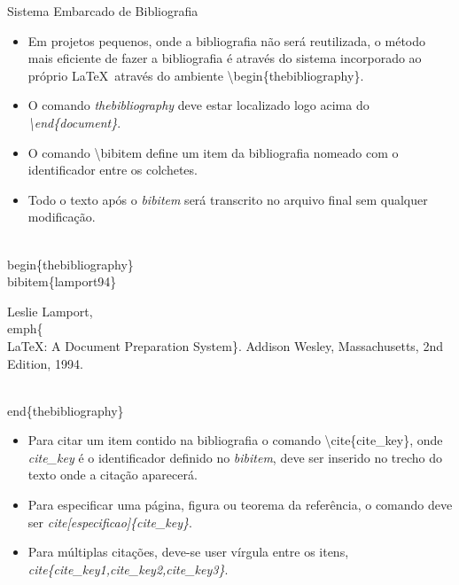 \begin{frame}{Sistema Embarcado de Bibliografia}

  \begin{itemize}
    \item Em projetos pequenos, onde a bibliografia não será reutilizada, o método mais eficiente de fazer a bibliografia
    é através do sistema incorporado ao próprio \LaTeX\ através do ambiente \alert{\textbackslash begin\{thebibliography\}}.    
    \item O comando \textit{thebibliography} deve estar localizado logo acima do \textit{\textbackslash end\{document\}}.
    \item O comando \alert{\textbackslash bibitem} define um item da bibliografia nomeado com o identificador entre os colchetes.
    \item Todo o texto após o \textit{bibitem} será transcrito no arquivo final sem qualquer modificação.
  \end{itemize}

  \begin{example}
  \begin{semiverbatim}
    \\begin\{thebibliography\}
    \\bibitem\{lamport94\}

      Leslie Lamport,
      \\emph\{\\LaTeX: A Document Preparation System\}.
      Addison Wesley, Massachusetts,
      2nd Edition,
      1994.

    \\end\{thebibliography\}
  \end{semiverbatim}
  \end{example}

    \newpage

  \begin{itemize}
   \item Para citar um item contido na bibliografia o comando \alert{\textbackslash cite\{cite\_key\}}, onde \textit{cite\_key} é o 
   identificador definido no \textit{bibitem}, deve ser inserido no trecho do texto onde a citação aparecerá.
   \item Para especificar uma página, figura ou teorema da referência, o comando deve ser \textit{cite[especificao]\{cite\_key\}}.
   \item Para múltiplas citações, deve-se user vírgula entre os itens, \textit{cite\{cite\_key1,cite\_key2,cite\_key3\}}.    
  \end{itemize}
 
\end{frame}

